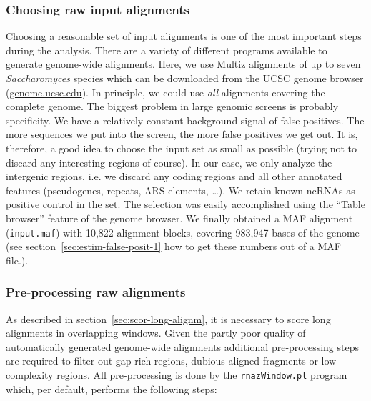 \documentclass[11pt]{article}
\begin{document}
\subsubsection{Choosing raw input alignments}

Choosing a reasonable set of input alignments is one of the most important
steps during the analysis. There are a variety of different programs
available to generate genome-wide alignments. Here, we use Multiz
alignments of up to seven \emph{Saccharomyces} species which can be
downloaded from the UCSC genome browser (\url{genome.ucsc.edu}). In
principle, we could use \emph{all} alignments covering the complete genome.
The biggest problem in large genomic screens is probably specificity. We
have a relatively constant background signal of false positives. The more
sequences we put into the screen, the more false positives we get out. It
is, therefore, a good idea to choose the input set as small as possible
(trying not to discard any interesting regions of course). In our case, we
only analyze the intergenic regions, i.e. we discard any coding regions and
all other annotated features (pseudogenes, repeats, ARS elements, \dots).
We retain known ncRNAs as positive control in the set.  The selection was
easily accomplished using the ``Table browser'' feature of the genome
browser. We finally obtained a MAF alignment (\texttt{input.maf}) with
10,822 alignment blocks, covering 983,947 bases of the genome (see
section~\ref{sec:estim-false-posit-1} how to get these numbers out of a MAF
file.).

\subsubsection{Pre-processing raw alignments}

As described in section~\ref{sec:scor-long-alignm}, it is necessary to
score long alignments in overlapping windows. Given the partly poor quality
of automatically generated genome-wide alignments additional pre-processing
steps are required to filter out gap-rich regions, dubious aligned
fragments or low complexity regions. All pre-processing is done by the
\texttt{rnazWindow.pl} program which, per default, performs the following
steps:
\end{document}
